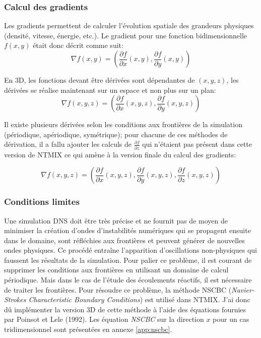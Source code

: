 
\subsubsection{Calcul des gradients}%

Les gradients permettent de calculer l'évolution spatiale des grandeurs physiques (densité, vitesse, énergie, etc.). Le gradient pour une fonction bidimensionnelle $f(x,y)$ était donc décrit comme suit:
$$\nabla f(x,y) =\left(\frac{\partial f}{\partial x}(x,y),\frac{\partial f}{\partial y}(x,y)\right) $$

En 3D, les fonctions devant être dérivées sont dépendantes de $(x,y,z)$, les dérivées se réalise maintenant sur un espace et non plus sur un plan:
$$ \nabla f(x,y,z) =\left(\frac{\partial f}{\partial x}(x,y,z),\frac{\partial f}{\partial y}(x,y,z)\right)$$


Il existe plusieurs dérivées selon les conditions aux frontières de la simulation (périodique, apériodique, symétrique); pour chacune de ces méthodes de dérivation, il a fallu ajouter les calculs de $\frac{\partial f}{\partial z}$ qui n'étaient pas présent dans cette version de NTMIX ce qui amène à la version finale du calcul des gradients:

$$ \nabla f(x,y,z) =\left(\frac{\partial f}{\partial x}(x,y,z),\frac{\partial f}{\partial y}(x,y,z),\frac{\partial f}{\partial z}(x,y,z)\right)$$



\subsubsection{Conditions limites}\label{sec:nsbc}
Une simulation DNS doit être très précise et ne fournit pas de moyen de minimiser la création d'ondes d'instabilités numériques qui se propagent ensuite dans le domaine, sont réfléchies aux frontières et peuvent générer de nouvelles ondes physiques\cite{baritaud1996direct}. Ce procédé entraîne l'apparition d'oscillations non-physiques qui faussent les résultats de la simulation. Pour palier ce problème, il est courant de supprimer les conditions aux frontières en utilisant un domaine de calcul périodique. Mais dans le cas de l'étude des écoulements réactifs, il est nécessaire de traiter les frontières. Pour résoudre ce problème, la méthode NSCBC (\textit{Navier-Strokes Characteristic Boundary Conditions}) est utilisé dans NTMIX. J'ai donc dû implémenter la version 3D de cette méthode à l'aide des équations fournies par Poinsot et Lele (1992)\cite{POINSOT1992104}. Les équation \textit{NSCBC} sur la direction $x$ pour un cas tridimensionnel sont présentées en annexe \ref{app:nscbc}. 



